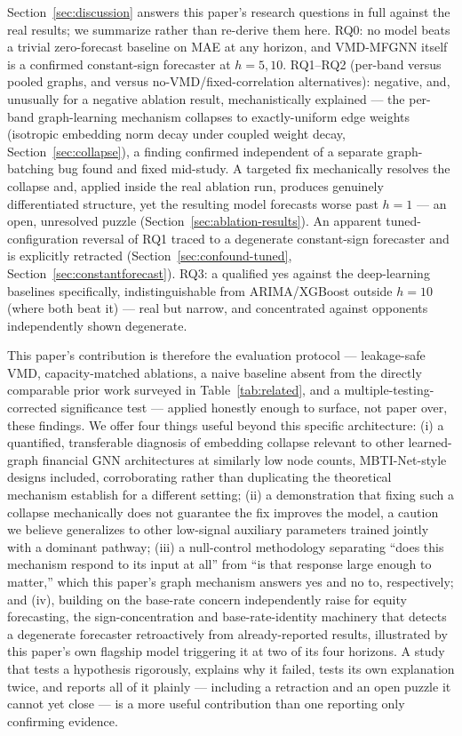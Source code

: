 \documentclass[journal]{IEEEtran}
\begin{document}
Section~\ref{sec:discussion} answers this paper's research questions in full against the real results; we summarize rather than re-derive them here. RQ0: no model beats a trivial zero-forecast baseline on MAE at any horizon, and VMD-MFGNN itself is a confirmed constant-sign forecaster at $h=5,10$. RQ1--RQ2 (per-band versus pooled graphs, and versus no-VMD/fixed-correlation alternatives): negative, and, unusually for a negative ablation result, mechanistically explained --- the per-band graph-learning mechanism collapses to exactly-uniform edge weights (isotropic embedding norm decay under coupled weight decay, Section~\ref{sec:collapse}), a finding confirmed independent of a separate graph-batching bug found and fixed mid-study. A targeted fix mechanically resolves the collapse and, applied inside the real ablation run, produces genuinely differentiated structure, yet the resulting model forecasts worse past $h=1$ --- an open, unresolved puzzle (Section~\ref{sec:ablation-results}). An apparent tuned-configuration reversal of RQ1 traced to a degenerate constant-sign forecaster and is explicitly retracted (Section~\ref{sec:confound-tuned}, Section~\ref{sec:constantforecast}). RQ3: a qualified yes against the deep-learning baselines specifically, indistinguishable from ARIMA/XGBoost outside $h=10$ (where both beat it) --- real but narrow, and concentrated against opponents independently shown degenerate.

This paper's contribution is therefore the evaluation protocol --- leakage-safe VMD, capacity-matched ablations, a naive baseline absent from the directly comparable prior work surveyed in Table~\ref{tab:related}, and a multiple-testing-corrected significance test --- applied honestly enough to surface, not paper over, these findings. We offer four things useful beyond this specific architecture: (i) a quantified, transferable diagnosis of embedding collapse relevant to other learned-graph financial GNN architectures at similarly low node counts, MBTI-Net-style designs included, corroborating rather than duplicating the theoretical mechanism \citet{Fountoulakis2023} establish for a different setting; (ii) a demonstration that fixing such a collapse mechanically does not guarantee the fix improves the model, a caution we believe generalizes to other low-signal auxiliary parameters trained jointly with a dominant pathway; (iii) a null-control methodology separating ``does this mechanism respond to its input at all'' from ``is that response large enough to matter,'' which this paper's graph mechanism answers yes and no to, respectively; and (iv), building on the base-rate concern \citet{Cheung2026} independently raise for equity forecasting, the sign-concentration and base-rate-identity machinery that detects a degenerate forecaster retroactively from already-reported results, illustrated by this paper's own flagship model triggering it at two of its four horizons. A study that tests a hypothesis rigorously, explains why it failed, tests its own explanation twice, and reports all of it plainly --- including a retraction and an open puzzle it cannot yet close --- is a more useful contribution than one reporting only confirming evidence.
\end{document}
